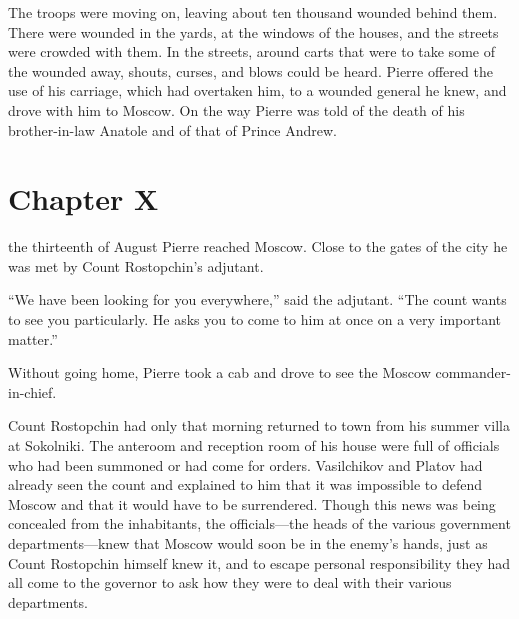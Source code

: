 The troops were moving on, leaving about ten thousand wounded
behind them. There were wounded in the yards, at the windows of
the houses, and the streets were crowded with them. In the
streets, around carts that were to take some of the wounded away,
shouts, curses, and blows could be heard. Pierre offered the use
of his carriage, which had overtaken him, to a wounded general he
knew, and drove with him to Moscow. On the way Pierre was told of
the death of his brother-in-law Anatole and of that of Prince
Andrew.


\chapter*{Chapter X} \ifaudio {}
\fi

 the thirteenth of August Pierre reached Moscow. Close to the
gates of the city he was met by Count Rostopchin's adjutant.

``We have been looking for you everywhere,'' said the
adjutant. ``The count wants to see you particularly. He asks you
to come to him at once on a very important matter.''

Without going home, Pierre took a cab and drove to see the Moscow
commander-in-chief.

Count Rostopchin had only that morning returned to town from his
summer villa at Sokolniki. The anteroom and reception room of his
house were full of officials who had been summoned or had come
for orders.  Vasilchikov and Platov had already seen the count
and explained to him that it was impossible to defend Moscow and
that it would have to be surrendered. Though this news was being
concealed from the inhabitants, the officials---the heads of the
various government departments---knew that Moscow would soon be
in the enemy's hands, just as Count Rostopchin himself knew it,
and to escape personal responsibility they had all come to the
governor to ask how they were to deal with their various
departments.

